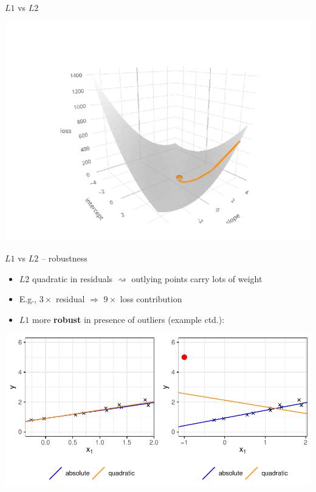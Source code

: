 \documentclass[11pt,compress,t,notes=noshow, xcolor=table]{beamer}
\begin{document}
\begin{vbframe}{$L1$ vs $L2$}
\begin{minipage}[b]{0.34\textwidth}
    \vfill
    
    \includegraphics[width=\textwidth, trim=80 0 100 80, clip]{
    figure/reg_l1_comparison_optim_quad.pdf}
\end{minipage}

\end{vbframe}


\begin{vbframe}{$L1$ vs $L2$ -- robustness}

\begin{itemize}
    \item $L2$ quadratic in residuals $\rightsquigarrow$ outlying points 
    carry lots of weight
    \item E.g., $3 \times$ residual $\Rightarrow$ $9 \times$ loss contribution
    \item $L1$ more \textbf{robust} in presence of outliers (example ctd.):
\end{itemize}

\vfill
\includegraphics[width=\textwidth]{figure/reg_l1_comparison_outlier.pdf}

\end{vbframe}
\end{document}
